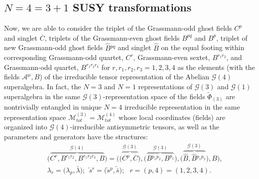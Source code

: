 \documentclass[10pt]{article}
\begin{document}
\subsection{$N=4 =3+1$  SUSY  transformations}\label{N4SUSY}

Now, we are able to consider the triplet of the Grassmann-odd ghost fields $C^p$ and singlet $\overline{C}$, triplets of the Grassmann-even ghost fields $B^{pq}$ and $B^p$, triplet of new Grassmann-odd ghost fields $\widehat{B}{}^{pq}$ and singlet $\widehat{B}$ on the equal footing within corresponding Grassmann-odd quartet, $C^r$, Grassmann-even sextet, $B^{r_1r_2}$, and Grassmann-odd quartet, $B^{r_1r_2r_3}$ for $r,r_1,r_2,r_3=1,2,3,4$ as the elements (with the fields $ \mathcal{A}^\mu, B$)
of the irreducible tensor representation of the Abelian  $\mathcal{G}(4)$ superalgebra. In fact, the $N=3$ and $N=1$ representations  of $\mathcal{G}(3)$ and $\mathcal{G}(1)$ superalgebra in the same $\mathcal{G}(3)$-representation space of the fields $\widetilde{\Phi}_{(3)}$  are nontrivially entangled  in unique $N=4$ irreducible representation in the same representation space  $\mathcal{M}^{(3)}_{tot}=\mathcal{M}^{(4)}_{tot}$  whose local coordinates (fields) are organized into $\mathcal{G}(4)$-irreducible antisymmetric tensors, as well as the parameters  and generators have the structures:
\begin{eqnarray}
  &&   \Big(\stackrel{\mathcal{G}(4)}{\overbrace{C^r, B^{r_1r_2}, B^{r_1r_2r_3},B}}\Big) =  \Big(\big(\stackrel{\mathcal{G}(3)}{\overbrace{C^p,\overline{C}}}\big), \big(\stackrel{\mathcal{G}(3)}{\overbrace{{B}{}^{p_1p_2},{B}^{p_1}}}\big)  , \big(\stackrel{\mathcal{G}(3)}{\overbrace{\widehat{B},\widehat{B}{}^{p_1p_2}}}\big), B\Big) , \label{corg3g4}\\
   && \lambda_r=\big(\lambda_p, \bar{\lambda}\big);\ \ \overleftarrow{s}{}^r =\big(\overleftarrow{s}{}^p, \overleftarrow{\bar{s}}\big);\ \ \ r=(p,4)=(1,2,3,4). \label{corg3g42}
\end{eqnarray}
\end{document}
